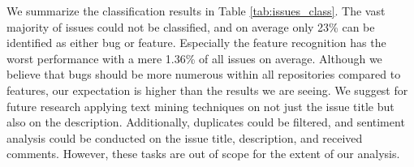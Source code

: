 \begin{table}[!htbp]
    \centering
    \caption{Issue classification results. The vast majority of issues could not be classified with the proposed keyword-based classification.}
    \label{tab:issues_class}
\end{table}

We summarize the classification results in Table \ref{tab:issues_class}. The vast majority of issues could not be classified, and on average only 23\% can be identified as either bug or feature. Especially the feature recognition has the worst performance with a mere 1.36\% of all issues on average. Although we believe that bugs should be more numerous within all repositories compared to features, our expectation is higher than the results we are seeing. We suggest for future research applying text mining techniques on not just the issue title but also on the description. Additionally, duplicates could be filtered, and sentiment analysis could be conducted on the issue title, description, and received comments. However, these tasks are out of scope for the extent of our analysis.


